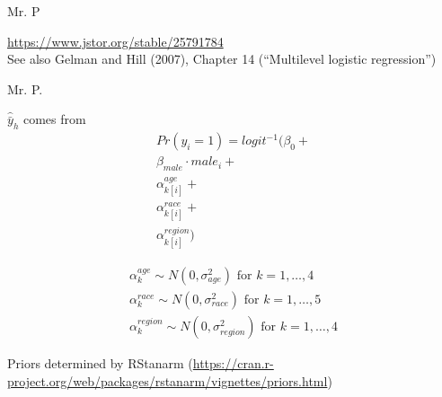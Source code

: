 \documentclass[aspectratio=169]{beamer}
\begin{document}
\begin{frame}{Mr. P}

\begin{center}
\end{center}

\vfill
\url{https://www.jstor.org/stable/25791784} \\ See also Gelman and Hill (2007), Chapter 14 (``Multilevel logistic regression'')

\end{frame}
\begin{frame}{Mr. P.}

$\hat{\bar{y}}_h$ comes from\\

\begin{align*}
Pr(y_i = 1) = logit^{-1} (\beta_0 + \\
 \beta_{male} \cdot male_i + \\
 \alpha_{k[i]}^{age} + \\
 \alpha_{k[i]}^{race} + \\
 \alpha_{k[i]}^{region})
\end{align*}

\begin{align*}
\alpha_{k}^{age} \sim N(0, \sigma^2_{age}) \text{ for } k = 1, \ldots, 4 \\
\alpha_{k}^{race} \sim N(0, \sigma^2_{race}) \text{ for } k = 1, \ldots, 5 \\
\alpha_{k}^{region}  \sim N(0, \sigma^2_{region}) \text{ for } k = 1, \ldots, 4
\end{align*}

Priors determined by RStanarm (\url{https://cran.r-project.org/web/packages/rstanarm/vignettes/priors.html})

\end{frame}
\end{document}
